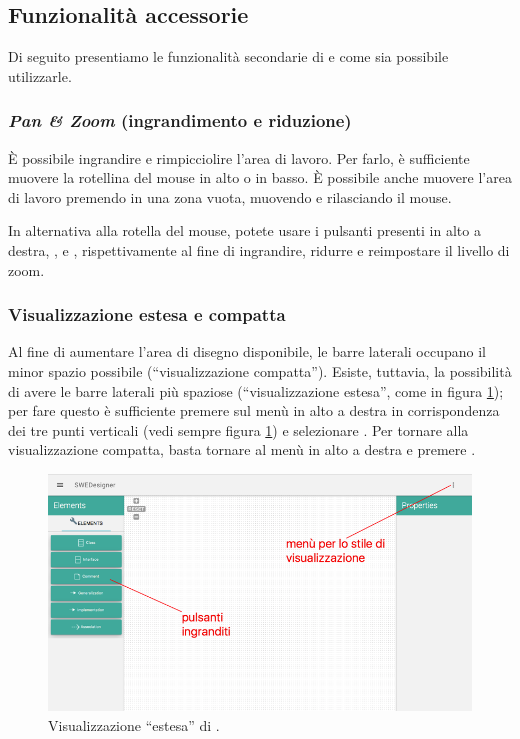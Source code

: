 \subsection{Funzionalità accessorie} \label{sec:extra}

Di seguito presentiamo le funzionalità secondarie di \proj{} e come sia possibile utilizzarle.

\subsubsection{\emph{Pan \& Zoom} (ingrandimento e riduzione)}
È possibile ingrandire e rimpicciolire l'area di lavoro. Per farlo, è sufficiente muovere la rotellina del mouse in alto o in basso. È possibile anche muovere l'area di lavoro premendo in una zona vuota, muovendo e rilasciando il mouse. 

In alternativa alla rotella del mouse, potete usare i pulsanti presenti in alto a destra, \click{+}, \click{-} e , rispettivamente al fine di ingrandire, ridurre e reimpostare il livello di zoom.

\subsubsection{Visualizzazione estesa e compatta}
Al fine di aumentare l'area di disegno disponibile, le barre laterali occupano il minor spazio possibile (“visualizzazione compatta”). Esiste, tuttavia, la possibilità di avere le barre laterali più spaziose (“visualizzazione estesa”, come in figura \ref{fig:extended}); per fare questo è sufficiente premere sul menù in alto a destra in corrispondenza dei tre punti verticali (vedi sempre figura \ref{fig:extended}) e selezionare . Per tornare alla visualizzazione compatta, basta tornare al menù in alto a destra e premere .

\begin{figure}[h]
\centering
	\includegraphics[scale=0.4]{img/extended}
	\caption{Visualizzazione “estesa” di \proj.}
	\label{fig:extended}
\end{figure}

